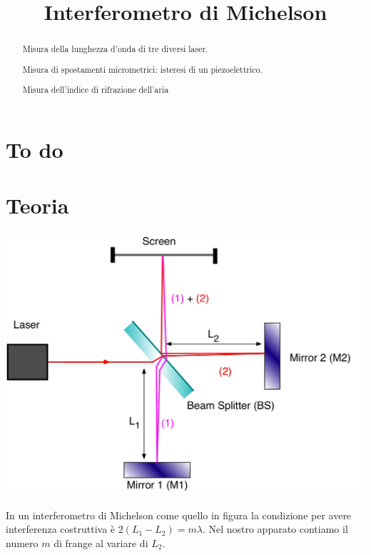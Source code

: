 \documentclass[a4paper]{article}
\begin{document}
	\title{Interferometro di Michelson}
	\maketitle
	
	\section*{To do}
	
	
	\begin{abstract}
		 Misura della lunghezza d'onda di tre diversi laser.
		 
		 Misura di spostamenti micrometrici: isteresi di un piezoelettrico.
		 
		 Misura dell'indice di rifrazione dell'aria
	\end{abstract}

\section{Teoria}
\begin{center}
	\begin{minipage}[c]{.50\textwidth}
		\centering
		\includegraphics[width=1\textwidth]{michelson.png}
	\end{minipage}
	\begin{minipage}[c]{.40\textwidth}
		In un interferometro di Michelson come quello in figura la condizione per avere interferenza costruttiva è $2(L_1 -L_2) = m \lambda$. Nel nostro apparato contiamo il numero $m$ di frange al variare di $L_2$. 
	\end{minipage}
\end{center}
\end{document}
